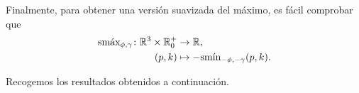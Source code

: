 Finalmente, para obtener una versión suavizada del máximo, es fácil comprobar que 
\begin{align*}
      \smax_{\phi,\gamma}\colon \R^3\times \R^+_0 &\to \R,\\
      (p,k) &\mapsto -\smin_{-\phi,-\gamma}(p,k).
\end{align*}

Recogemos los resultados obtenidos a continuación.









